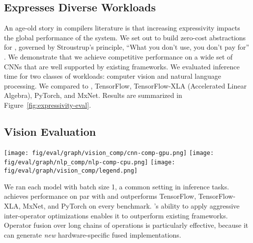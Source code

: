 \subsection{\relay Expresses Diverse Workloads}
\label{sec:perf-gpu}

An age-old story in compilers literature is that increasing expressivity
  impacts the global performance of the system.
We set out to build zero-cost abstractions for \relay,
  governed by Stroustrup's principle, ``What you don't use, you don't pay
  for'' \citep{bjarne}.
We demonstrate that we achieve competitive performance on a wide set of CNNs that are well supported by existing frameworks.
We evaluated inference time for two classes of workloads: computer vision and natural language processing.
We compared \relay to \nnvm,
  TensorFlow, TensorFlow-XLA (Accelerated Linear Algebra), PyTorch, and MxNet.
Results are summarized in Figure~\ref{fig:expressivity-eval}.

\subsection*{Vision Evaluation}

\begin{figure*}[htbp!]
  \centering
  \texttt{[image: fig/eval/graph/vision\_comp/cnn-comp-gpu.png]}
  \texttt{[image: fig/eval/graph/nlp\_comp/nlp-comp-cpu.png]}
  \texttt{[image: fig/eval/graph/vision\_comp/legend.png]}
  \caption{\textmd{
    Inference speedup of \relay relative to popular frameworks
      on vision and NLP benchmarks.
    The vision benchmarks used an NVIDIA Titan-V GPU, and the NLP benchmarks ran on CPU only.
    We ran 1000 trials for each model, except for CharRNN, on which we used 100 trials.
    \relay matches the performance of NNVM on vision but additionally supports NLP,
      where \relay provides performance competitive to the state of the art (up to
        2.3$\times$ speedup over MxNet on GRU).
  }}
  \label{fig:expressivity-eval}
\end{figure*}

We ran each model with
  batch size 1, a common setting in inference tasks.
\relay achieves performance on par with \nnvm
  and outperforms TensorFlow, TensorFlow-XLA, MxNet, and
  PyTorch on every benchmark.
\relay's ability to apply aggressive inter-operator optimizations
  enables it to outperform existing frameworks.
Operator fusion over long chains of operations is particularly effective,
  because it can generate \textit{new} hardware-specific fused implementations.


